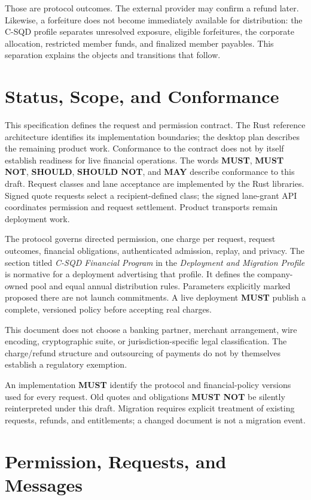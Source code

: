 \documentclass[11pt]{article}
\newcommand{\MUST}{\textbf{MUST}}
\newcommand{\MUSTNOT}{\textbf{MUST NOT}}
\newcommand{\SHOULD}{\textbf{SHOULD}}
\newcommand{\SHOULDNOT}{\textbf{SHOULD NOT}}
\newcommand{\MAY}{\textbf{MAY}}
\begin{document}
Those are protocol outcomes. The external provider may confirm a refund later.
Likewise, a forfeiture does not become immediately available for distribution:
the C-SQD profile separates unresolved exposure, eligible forfeitures, the
corporate allocation, restricted member funds, and finalized member payables.
This separation explains the objects and transitions that follow.

\section{Status, Scope, and Conformance}

This specification defines the request and permission contract. The Rust reference
architecture identifies its implementation boundaries; the desktop plan describes
the remaining product work. Conformance to the contract does not by itself
establish readiness for live financial operations. The words \MUST, \MUSTNOT, \SHOULD,
\SHOULDNOT, and \MAY{} describe conformance to this draft.
Request classes and lane acceptance are implemented by the Rust libraries.
Signed quote requests select a recipient-defined class; the signed lane-grant
API coordinates permission and request settlement. Product transports remain
deployment work.

The protocol governs directed permission, one charge per request, request
outcomes, financial obligations, authenticated admission, replay, and privacy.
The section titled \emph{C-SQD Financial Program} in the \textit{Deployment and
Migration Profile} is normative for a deployment advertising that profile. It
defines the company-owned pool and equal annual distribution rules. Parameters
explicitly marked proposed there are not launch commitments. A live deployment
\MUST{} publish a complete, versioned policy before accepting real charges.

This document does not choose a banking partner, merchant arrangement, wire
encoding, cryptographic suite, or jurisdiction-specific legal classification.
The charge/refund structure and outsourcing of payments do not by themselves
establish a regulatory exemption.

An implementation \MUST{} identify the protocol and financial-policy versions
used for every request. Old quotes and obligations \MUSTNOT{} be silently
reinterpreted under this draft. Migration requires explicit treatment of existing
requests, refunds, and entitlements; a changed document is not a migration event.

\section{Permission, Requests, and Messages}
\end{document}
